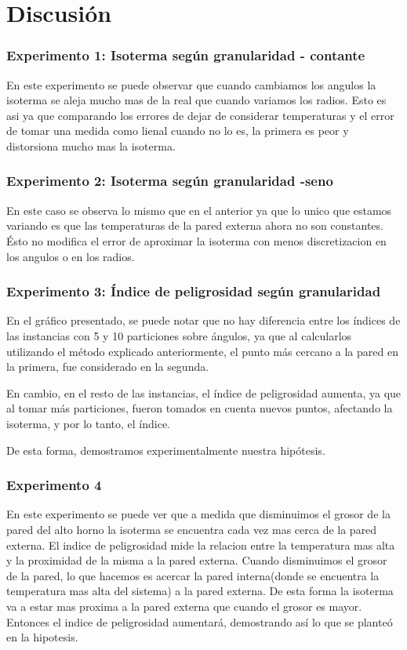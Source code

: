 \section{Discusión}

{
\subsubsection*{Experimento 1: Isoterma según granularidad - contante}
	En este experimento se puede observar que cuando cambiamos los angulos la isoterma se aleja mucho mas de la real que cuando variamos los radios. Esto es asi ya que comparando los errores de dejar de considerar temperaturas y el error de tomar una medida como lienal cuando no lo es, la primera es peor y distorsiona mucho mas la isoterma.
	


\subsubsection*{Experimento 2: Isoterma según granularidad -seno}
	En este caso se observa lo mismo que en el anterior ya que lo unico que estamos variando es que las temperaturas de la pared externa ahora no son constantes. Ésto no modifica el error de aproximar la isoterma con menos discretizacion en los angulos o en los radios.



\subsubsection*{Experimento 3: Índice de peligrosidad según granularidad}
  	En el gráfico presentado, se puede notar que no hay diferencia entre los índices de las instancias con 5 y 10 particiones sobre ángulos, ya que al calcularlos utilizando el método explicado anteriormente, el punto más cercano a la pared en la primera, fue considerado en la segunda. 

  	En cambio, en el resto de las instancias, el índice de peligrosidad aumenta, ya que al tomar más particiones, fueron tomados en cuenta nuevos puntos, afectando la isoterma, y por lo tanto, el índice. 

  	De esta forma, demostramos experimentalmente nuestra hipótesis. 


\subsubsection*{Experimento 4}
	En este experimento se puede ver que a medida que disminuimos el grosor de la pared del alto horno la isoterma se encuentra cada vez mas cerca de la pared externa. El indice de peligrosidad mide la relacion entre la temperatura mas alta y la proximidad de la misma a la pared externa. Cuando disminuimos el grosor de la pared, lo que hacemos es acercar la pared interna(donde se encuentra la temperatura mas alta del sistema) a la pared externa. De esta forma la isoterma va a estar mas proxima a la pared externa que cuando el grosor es mayor. Entonces el indice de peligrosidad aumentará, demostrando así lo que se planteó en la hipotesis.
	

}
